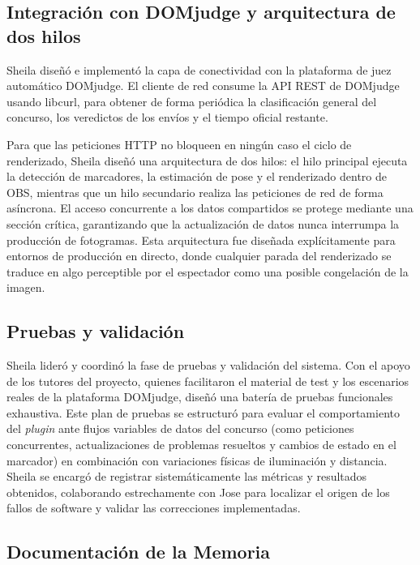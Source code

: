 \subsection*{Integración con DOMjudge y arquitectura de dos hilos}

Sheila diseñó e implementó la capa de conectividad con la plataforma de juez automático DOMjudge. El cliente de red consume la API REST de DOMjudge usando libcurl, para obtener de forma periódica la clasificación general del concurso, los veredictos de los envíos y el tiempo oficial restante.

Para que las peticiones HTTP no bloqueen en ningún caso el ciclo de renderizado, Sheila diseñó una arquitectura de dos hilos: el hilo principal ejecuta la detección de marcadores, la estimación de pose y el renderizado dentro de OBS, mientras que un hilo secundario realiza las peticiones de red de forma asíncrona. El acceso concurrente a los datos compartidos se protege mediante una sección crítica, garantizando que la actualización de datos nunca interrumpa la producción de fotogramas. Esta arquitectura fue diseñada explícitamente para entornos de producción en directo, donde cualquier parada del renderizado se traduce en algo perceptible por el espectador como una posible congelación de la imagen.

\subsection*{Pruebas y validación}

Sheila lideró y coordinó la fase de pruebas y validación del sistema. Con el apoyo de los tutores del proyecto, quienes facilitaron el material de test y los escenarios reales de la plataforma DOMjudge, diseñó una batería de pruebas funcionales exhaustiva. Este plan de pruebas se estructuró para evaluar el comportamiento del \textit{plugin} ante flujos variables de datos del concurso (como peticiones concurrentes, actualizaciones de problemas resueltos y cambios de estado en el marcador) en combinación con variaciones físicas de iluminación y distancia. Sheila se encargó de registrar sistemáticamente las métricas y resultados obtenidos, colaborando estrechamente con Jose para localizar el origen de los fallos de software y validar las correcciones implementadas.

\subsection* {Documentación de la Memoria}

